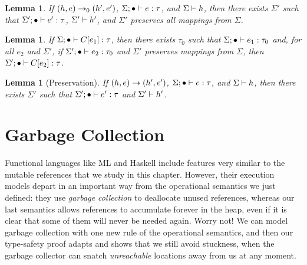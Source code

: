 \documentclass{amsbook}
\newtheorem{lemma}[theorem]{Lemma}
\theoremstyle{definition}
\theoremstyle{remark}
\numberwithin{section}{chapter}
\numberwithin{equation}{chapter}
\begin{document}
\begin{lemma}\label{preservation0}
  If $(h, e) \to_0 (h', e')$, $\Sigma; \bullet \vdash e : \tau$, and $\Sigma \vdash h$, then there exists $\Sigma'$ such that $\Sigma'; \bullet \vdash e' : \tau$, $\Sigma' \vdash h'$, and $\Sigma'$ preserves all mappings from $\Sigma$.
\end{lemma}

\begin{lemma}\label{generalize_plug}
  If $\Sigma; \bullet \vdash C[e_1] : \tau$, then there exists $\tau_0$ such that $\Sigma; \bullet \vdash e_1 : \tau_0$ and, for all $e_2$ and $\Sigma'$, if $\Sigma'; \bullet \vdash e_2 : \tau_0$ and $\Sigma'$ preserves mappings from $\Sigma$, then $\Sigma'; \bullet \vdash C[e_2] : \tau$.
\end{lemma}

\begin{lemma}[Preservation]\label{preservation}
  If $(h, e) \to (h', e')$, $\Sigma; \bullet \vdash e : \tau$, and $\Sigma \vdash h$, then there exists $\Sigma'$ such that $\Sigma'; \bullet \vdash e' : \tau$ and $\Sigma' \vdash h'$.
\end{lemma}


\section{Garbage Collection}

Functional languages like ML and Haskell include features very similar to the mutable references that we study in this chapter.
However, their execution models depart in an important way from the operational semantics we just defined: they use \emph{garbage collection} to deallocate unused references, whereas our last semantics allows references to accumulate forever in the heap, even if it is clear that some of them will never be needed again.
Worry not!
We can model garbage collection with one new rule of the operational semantics, and then our type-safety proof adapts and shows that we still avoid stuckness, when the garbage collector can snatch \emph{unreachable} locations away from us at any moment.

\newcommand{\freeloc}[1]{\mathsf{freeloc}(#1)}
\end{document}
